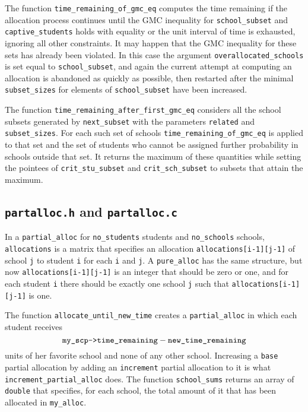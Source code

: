 \documentclass[12pt]{article}
\theoremstyle{definition}
\begin{document}
\begin{appendix}
The function \texttt{time\_remaining\_of\_gmc\_eq} computes the time
remaining if the allocation process continues until the GMC inequality
for \texttt{school\_subset} and \texttt{captive\_students} holds with
equality or the unit interval of time is exhausted, ignoring all other
constraints.  It may happen that the GMC inequality for these sets has
already been violated.  In this case the argument
\texttt{overallocated\_schools} is set equal to
\texttt{school\_subset}, and again the current attempt at computing an
allocation is abandoned as quickly as possible, then restarted after
the minimal \texttt{subset\_sizes} for elements of
\texttt{school\_subset} have been increased.


The function \texttt{time\_remaining\_after\_first\_gmc\_eq} considers
all the school subsets generated by \texttt{next\_subset} with the
parameters \texttt{related} and \texttt{subset\_sizes}.  For each such
set of schools \texttt{time\_remaining\_of\_gmc\_eq} is applied to
that set and the set of students who cannot be assigned further
probability in schools outside that set.  It returns the maximum of
these quantities while setting the pointees of
\texttt{crit\_stu\_subset} and \texttt{crit\_sch\_subset} to subsets
that attain the maximum.

\subsection{\texttt{partalloc.h} and \texttt{partalloc.c}}

In a \texttt{partial\_alloc} for \texttt{no\_students} students and
\texttt{no\_schools} schools, \texttt{allocations} is a matrix that
specifies an allocation \texttt{allocations[i-1][j-1]} of school
\texttt{j} to student \texttt{i} for each \texttt{i} and \texttt{j}.
A \texttt{pure\_alloc} has the same structure, but now
\texttt{allocations[i-1][j-1]} is an integer that should be zero or
one, and for each student \texttt{i} there should be exactly one
school \texttt{j} such that \texttt{allocations[i-1][j-1]} is one.

The function
\texttt{allocate\_until\_new\_time} creates a \texttt{partial\_alloc}
in which each student receives
$$\text{\texttt{my\_scp->time\_remaining}} -
\text{\texttt{new\_time\_remaining}}$$ units of her favorite school
and none of any other school.  Increasing a \texttt{base} partial
allocation by adding an \texttt{increment} partial allocation to it is
what \texttt{increment\_partial\_alloc} does.  The function
\texttt{school\_sums} returns an array of \texttt{double} that
specifies, for each school, the total amount of it that has been
allocated in \texttt{my\_alloc}.


\end{appendix}
\end{document}
